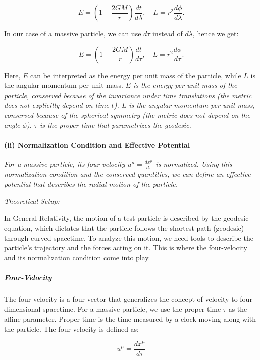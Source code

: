 \begin{equation}
E = \left(1 - \frac{2GM}{r}\right) \frac{dt}{d\lambda},
\quad
L = r^{2} \frac{d\phi}{d\lambda}.
\end{equation}

In our case of a massive particle, we can use $d\tau$ instead of $d\lambda$, hence we get:

\begin{equation}
E = \left(1 - \frac{2GM}{r}\right) \frac{dt}{d\tau},
\quad
L = r^{2} \frac{d\phi}{d\tau}.
\end{equation}

Here, \(E\) can be interpreted as the energy per unit mass of the particle, while \(L\) is the angular momentum per unit mass.
\textit{\(E\) is the energy per unit mass of the particle, conserved because of the invariance under time translations (the metric does not explicitly depend on time \(t\)). \(L\) is the angular momentum per unit mass, conserved because of the spherical symmetry (the metric does not depend on the angle \(\phi\)). \(\tau\) is the proper time that parametrizes the geodesic.}

\paragraph{(ii) Normalization Condition and Effective Potential}
\textit{For a massive particle, its four-velocity \(u^\mu = \frac{dx^\mu}{d\tau}\) is normalized. Using this normalization condition and the conserved quantities, we can define an effective potential that describes the radial motion of the particle.}

\textit{Theoretical Setup:}

In General Relativity, the motion of a test particle is described by the geodesic equation, which dictates that the particle follows the shortest path (geodesic) through curved spacetime. To analyze this motion, we need tools to describe the particle's trajectory and the forces acting on it. This is where the four-velocity and its normalization condition come into play.

\subparagraph{Four-Velocity}

The four-velocity is a four-vector that generalizes the concept of velocity to four-dimensional spacetime. For a massive particle, we use the proper time \(\tau\) as the affine parameter. Proper time is the time measured by a clock moving along with the particle. The four-velocity is defined as:

\begin{equation}
u^\mu = \frac{dx^\mu}{d\tau}
\end{equation}

